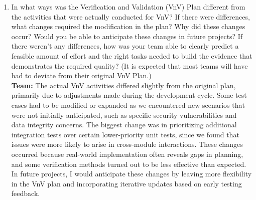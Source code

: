 \documentclass[12pt, titlepage]{article}
\begin{document}
\begin{enumerate}
  \item In what ways was the Verification and Validation (VnV) Plan different
  from the activities that were actually conducted for VnV?  If there were
  differences, what changes required the modification in the plan?  Why did
  these changes occur?  Would you be able to anticipate these changes in future
  projects?  If there weren't any differences, how was your team able to clearly
  predict a feasible amount of effort and the right tasks needed to build the
  evidence that demonstrates the required quality?  (It is expected that most
  teams will have had to deviate from their original VnV Plan.) \\
  \textbf{Team: } The actual VnV activities differed slightly from the original plan, primarily due to adjustments made during the development cycle. Some test cases had to be modified or expanded as we encountered new scenarios that were not initially anticipated, such as specific security vulnerabilities and data integrity concerns. The biggest change was in prioritizing additional integration tests over certain lower-priority unit tests, since we found that issues were more likely to arise in cross-module interactions. These changes occurred because real-world implementation often reveals gaps in planning, and some verification methods turned out to be less effective than expected. In future projects, I would anticipate these changes by leaving more flexibility in the VnV plan and incorporating iterative updates based on early testing feedback.


\end{enumerate}
\end{document}
